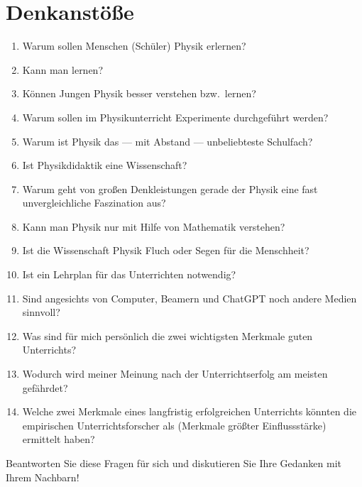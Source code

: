 \chapter{Denkanstöße}\label{Denk}

\begin{enumerate}[label=Q\arabic*:]
	\item
	Warum sollen Menschen (Sch\"{u}ler) Physik erlernen?
	\item
	Kann man  lernen?
	\item
	K\"{o}nnen Jungen Physik besser verstehen bzw.\ lernen?
	\item
	Warum sollen im Physikunterricht Experimente durchgef\"{u}hrt werden?
	\item
	Warum ist Physik das --- mit Abstand --- unbeliebteste Schulfach?
	\item
	Ist Physikdidaktik eine Wissenschaft?
	\item
	Warum geht von gro{\ss}en Denkleistungen gerade der Physik eine fast unvergleichliche Faszination aus?
	\item
	Kann man Physik nur mit Hilfe von Mathematik verstehen?
	\item
	Ist die Wissenschaft Physik Fluch oder Segen f\"{u}r die Menschheit?
	\item
	Ist ein Lehrplan f\"{u}r das Unterrichten notwendig?
	\item Sind angesichts von Computer, Beamern und ChatGPT  noch andere Medien sinnvoll?
	\item Was sind für mich persönlich die zwei wichtigsten Merkmale guten Unterrichts?
	\item Wodurch wird meiner Meinung nach der Unterrichtserfolg am meisten gefährdet?
	\item Welche zwei Merkmale eines langfristig erfolgreichen Unterrichts könnten die empirischen Unterrichtsforscher als  (Merkmale größter Einflussstärke) ermittelt haben?
\end{enumerate}

\begin{uea}
	Beantworten Sie diese Fragen für sich und diskutieren Sie Ihre Gedanken mit Ihrem Nachbarn!
\end{uea}